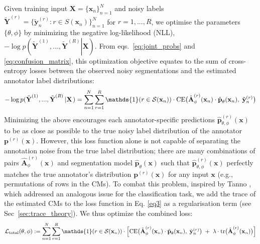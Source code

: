 Given training input $\textbf{X}=\{\textbf{x}_n\}_{n=1}^N$ and noisy labels ${\tilde{\textbf{Y}}^{(r)}} = \{ \tilde{ \textbf{y}}_n^{(r)}: r \in S(\textbf{x}_n)\} _{n = 1}^N$ for $r=1,...,R$, we optimise the parameters $\{ \theta , \phi \}$ by minimizing the negative log-likelihood (NLL), $ - \log p({\tilde{\textbf{Y}}^{(1)}},...,{\tilde{\textbf{Y}}^{(R)}}\left| \textbf{X} \right.)$. From eqs.~\eqref{eq:joint_probs} and \eqref{eq:confusion_matrix}, this optimization objective equates to the sum of cross-entropy losses between the observed noisy segmentations and the estimated annotator label distributions:
\begin{equation}
    - \log p({\tilde{\textbf{Y}}^{(1)}},...,{\tilde{\textbf{Y}}^{(R)}}\left| \textbf{X} \right.) = \sum\limits_{n = 1}^N {\sum\limits_{r = 1}^R  \mathds{1}(r \in \mathcal{S}({\textbf{x}_n}))}  \cdot
    \text{CE}\big{(}\hat{\textbf{A}}_{\phi}^{(r)}(\textbf{x}_n)\cdot \hat{\textbf{p}}_\theta ({\textbf{x}_n}), \hspace{1mm} \tilde{\textbf{y}}_n^{(r)}\big{)} 
    \label{eq3}
\end{equation}
Minimizing the above encourages each annotator-specific predictions $\hat{\textbf{p}}_{\theta, \phi}^{(r)}(\textbf{x})$ to be as close as possible to the true noisy label distribution of the annotator ${\textbf{p}^{(r)}}(\textbf{x})$. However, this loss function alone is not capable of separating the annotation noise from the true label distribution; there are many combinations of pairs $ {\hat{\textbf{A}}_{\phi}^{(r)}}(\mathbf{x})$ and segmentation model $\hat{\textbf{p}}_\theta(\mathbf{x})$ such that $\hat{\textbf{p}}_{\theta, \phi}^{(r)}(\textbf{x})$ perfectly matches the true annotator's distribution $\textbf{p}^{(r)}(\mathbf{x})$ for any input $\textbf{x}$ (e.g., permutations of rows in the CMs). To combat this problem, inspired by Tanno \etal \cite{tanno2019learning}, which addressed an analogous issue for the classification task, we add the trace of the estimated CMs to the loss function in Eq. \eqref{eq3} as a regularisation term (see Sec~\ref{sec:trace_theory}). We thus optimize the combined loss:
\begin{equation}
    \mathcal{L}_{\text{total}}(\theta, \phi) := \sum\limits_{n = 1}^N {\sum\limits_{r = 1}^R \mathds{1}(r \in \mathcal{S}({\textbf{x}_n}))} \cdot \Big{[} \text{CE}\big{(}\hat{\textbf{A}}_{\phi}^{(r)}(\textbf{x}_n)\cdot \hat{\textbf{p}}_\theta({\textbf{x}_n}),\hspace{1mm} \tilde{\textbf{y}}_n^{(r)}\big{)}\hspace{1mm} + \hspace{1mm}\lambda\cdot \text{tr}\big{(}\hat{\textbf{A}}_{\phi}^{(r)}(\textbf{x}_n)\big{)}\Big{]}
    \label{eq4}
\end{equation}
